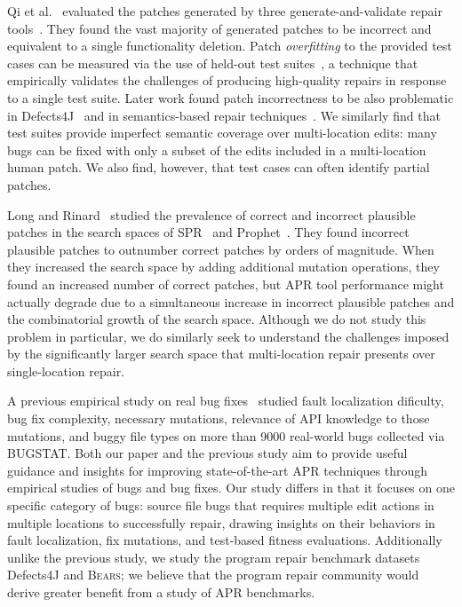 \documentclass[10pt, conference]{IEEEtran}
\newcommand\bears{\textsc{Bears}\xspace}
\begin{document}
Qi et al.~\cite{patch-correctness} evaluated the patches generated 
by three generate-and-validate repair tools~\cite{genprog, ae, rsrepair}. They found the 
vast majority of generated patches to be incorrect and equivalent to 
a single functionality deletion.  Patch \emph{overfitting} to the provided test
cases can be measured via the use of held-out test
suites~\cite{Smith15fse}, a technique that empirically validates the challenges of producing
high-quality repairs in response to a single test suite.   Later work found patch incorrectness to be 
also problematic in Defects4J~\cite{d4j-eval} and in semantics-based 
repair techniques~\cite{Le2018}.  We similarly find that test suites provide
imperfect semantic coverage over multi-location edits: many bugs can be fixed
with only a subset of the edits included in a multi-location human patch.  We 
also find, however, that test cases can often identify partial patches. 

Long and Rinard~\cite{long-search-spaces} studied the prevalence of 
correct and incorrect plausible patches in the search spaces of SPR~\cite{spr} 
and Prophet~\cite{prophet}. They found incorrect plausible patches to outnumber 
correct patches by orders of magnitude. When they increased the search space 
by adding additional mutation operations, they found an increased number of 
correct patches, but APR tool performance might actually degrade due to a 
simultaneous increase in incorrect plausible patches and the combinatorial 
growth of the search space.  Although we do not study this problem in
particular, we do similarly seek to understand the challenges imposed by the
significantly larger search space that multi-location repair presents over
single-location repair. 

A previous empirical study on real bug fixes~\cite{zhong2015} 
studied fault localization dificulty, bug fix complexity, necessary
mutations, relevance of API knowledge to those mutations, and buggy file types
on more than 9000 real-world bugs
collected via BUGSTAT.  
Both our paper and the previous study aim to provide useful guidance and insights for 
improving state-of-the-art APR techniques through empirical studies of bugs and bug fixes. 
Our study differs in that it focuses on one specific category of bugs: 
source file bugs that requires multiple edit actions in multiple locations to successfully repair, 
drawing insights on their behaviors in fault localization, fix mutations, and test-based 
fitness evaluations. Additionally unlike the previous study, we study the program repair 
benchmark datasets Defects4J 
and \bears; we believe that the program repair community would derive greater 
benefit from a study of APR benchmarks.
\end{document}

